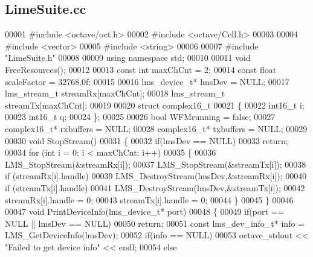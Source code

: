\subsection{Lime\+Suite.\+cc}
\label{LimeSuite_8cc_source}

\begin{DoxyCode}
00001 \textcolor{preprocessor}{#include <octave/oct.h>}
00002 \textcolor{preprocessor}{#include <octave/Cell.h>}
00003 
00004 \textcolor{preprocessor}{#include <vector>}
00005 \textcolor{preprocessor}{#include <string>}
00006 
00007 \textcolor{preprocessor}{#include "LimeSuite.h"}
00008 
00009 \textcolor{keyword}{using namespace }std;
00010 
00011 \textcolor{keywordtype}{void} FreeResources();
00012 
00013 \textcolor{keyword}{const} \textcolor{keywordtype}{int} maxChCnt = 2;
00014 \textcolor{keyword}{const} \textcolor{keywordtype}{float} scaleFactor = 32768.0f;
00015 
00016 lms_device_t* lmsDev = NULL;
00017 lms_stream_t streamRx[maxChCnt];
00018 lms_stream_t streamTx[maxChCnt];
00019 
00020 \textcolor{keyword}{struct }complex16_t
00021 \{
00022     int16\_t i;
00023     int16\_t q;
00024 \};
00025 
00026 \textcolor{keywordtype}{bool} WFMrunning = \textcolor{keyword}{false};
00027 complex16_t* rxbuffers = NULL;
00028 complex16_t* txbuffers = NULL;
00029 
00030 \textcolor{keywordtype}{void} StopStream()
00031 \{
00032     \textcolor{keywordflow}{if}(lmsDev == NULL)
00033         \textcolor{keywordflow}{return};
00034     \textcolor{keywordflow}{for} (\textcolor{keywordtype}{int} i = 0; i < maxChCnt; i++)
00035     \{
00036         LMS_StopStream(&streamRx[i]);
00037         LMS_StopStream(&streamTx[i]);
00038         \textcolor{keywordflow}{if} (streamRx[i].handle)
00039             LMS_DestroyStream(lmsDev,&streamRx[i]);
00040         \textcolor{keywordflow}{if} (streamTx[i].handle)
00041             LMS_DestroyStream(lmsDev,&streamTx[i]);
00042         streamRx[i].handle = 0;
00043         streamTx[i].handle = 0;
00044     \}
00045 \}
00046 
00047 \textcolor{keywordtype}{void} PrintDeviceInfo(lms_device_t* port)
00048 \{
00049     \textcolor{keywordflow}{if}(port == NULL || lmsDev == NULL)
00050         \textcolor{keywordflow}{return};
00051     \textcolor{keyword}{const} lms_dev_info_t* info = LMS_GetDeviceInfo(lmsDev);
00052     \textcolor{keywordflow}{if}(info == NULL)
00053         octave\_stdout << \textcolor{stringliteral}{"Failed to get device info"} << endl;
00054     \textcolor{keywordflow}{else}

\end{DoxyCode}
